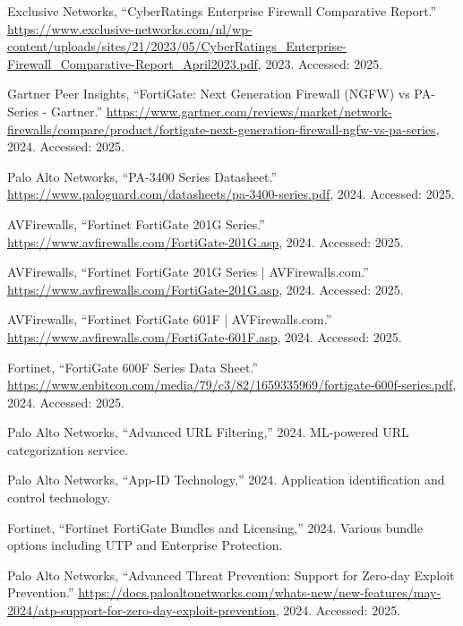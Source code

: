 \documentclass[12pt]{article}
\begin{document}
\begin{thebibliography}{10}
{Exclusive Networks}, ``{CyberRatings Enterprise Firewall Comparative
  Report}.''
  \url{https://www.exclusive-networks.com/nl/wp-content/uploads/sites/21/2023/05/CyberRatings_Enterprise-Firewall_Comparative-Report_April2023.pdf},
  2023.
\newblock Accessed: 2025.

{Gartner Peer Insights}, ``{FortiGate: Next Generation Firewall (NGFW) vs
  PA-Series - Gartner}.''
  \url{https://www.gartner.com/reviews/market/network-firewalls/compare/product/fortigate-next-generation-firewall-ngfw-vs-pa-series},
  2024.
\newblock Accessed: 2025.

{Palo Alto Networks}, ``{PA-3400 Series Datasheet}.''
  \url{https://www.paloguard.com/datasheets/pa-3400-series.pdf}, 2024.
\newblock Accessed: 2025.

{AVFirewalls}, ``{Fortinet FortiGate 201G Series}.''
  \url{https://www.avfirewalls.com/FortiGate-201G.asp}, 2024.
\newblock Accessed: 2025.

{AVFirewalls}, ``{Fortinet FortiGate 201G Series | AVFirewalls.com}.''
  \url{https://www.avfirewalls.com/FortiGate-201G.asp}, 2024.
\newblock Accessed: 2025.

{AVFirewalls}, ``{Fortinet FortiGate 601F | AVFirewalls.com}.''
  \url{https://www.avfirewalls.com/FortiGate-601F.asp}, 2024.
\newblock Accessed: 2025.

{Fortinet}, ``{FortiGate 600F Series Data Sheet}.''
  \url{https://www.enbitcon.com/media/79/c3/82/1659335969/fortigate-600f-series.pdf},
  2024.
\newblock Accessed: 2025.

{Palo Alto Networks}, ``{Advanced URL Filtering},'' 2024.
\newblock ML-powered URL categorization service.

{Palo Alto Networks}, ``{App-ID Technology},'' 2024.
\newblock Application identification and control technology.

{Fortinet}, ``{Fortinet FortiGate Bundles and Licensing},'' 2024.
\newblock Various bundle options including UTP and Enterprise Protection.

{Palo Alto Networks}, ``{Advanced Threat Prevention: Support for Zero-day
  Exploit Prevention}.''
  \url{https://docs.paloaltonetworks.com/whats-new/new-features/may-2024/atp-support-for-zero-day-exploit-prevention},
  2024.
\newblock Accessed: 2025.


\end{thebibliography}
\end{document}
